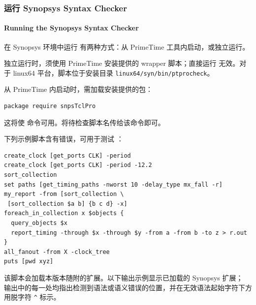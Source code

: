 \subsubsection{运行 Synopsys Syntax Checker}
\paragraph*{Running the Synopsys Syntax Checker}

在 Synopsys 环境中运行  有两种方式：从 PrimeTime 工具内启动，或独立运行。

独立运行时，须使用 PrimeTime 安装提供的 wrapper 脚本；直接运行  无效。对于 linux64 平台，脚本位于安装目录 \texttt{linux64/syn/bin/ptprocheck}。

从 PrimeTime 内启动时，需加载安装提供的包：
\begin{lstlisting}
package require snpsTclPro
\end{lstlisting}
这将使  命令可用。将待检查脚本名传给该命令即可。

下列示例脚本含有错误，可用于测试 ：
\begin{lstlisting}
create_clock [get_ports CLK] -period
create_clock [get_ports CLK] -period -12.2
sort_collection
set paths [get_timing_paths -nworst 10 -delay_type mx_fall -r]
my_report -from [sort_collection \
 [sort_collection $a b] {b c d} -x]
foreach_in_collection x $objects {
  query_objects $x
  report_timing -through $x -through $y -from a -from b -to z > r.out
}
all_fanout -from X -clock_tree
puts [pwd xyz]
\end{lstlisting}

该脚本会加载本版本随附的扩展。以下输出示例显示已加载的 Synopsys 扩展；
输出中的每一处均指出检测到语法或语义错误的位置，并在无效语法起始字符下方用脱字符
\texttt{\^{}} 标示。

